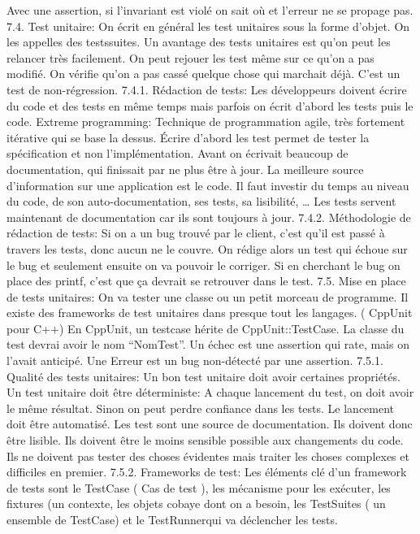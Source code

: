 Avec une assertion, si l’invariant est violé on sait où et l’erreur ne se propage pas.
7.4. Test unitaire:
On écrit en général les test unitaires sous la forme d’objet. On les appelles des testssuites.
Un avantage des tests unitaires est qu’on peut les relancer très facilement. On peut rejouer les test même sur ce qu’on a pas modifié. On vérifie qu’on a pas cassé quelque chose qui marchait déjà. C’est un test de non-régression.
7.4.1. Rédaction de tests:
Les développeurs doivent écrire du code et des tests en même temps mais parfois on écrit d’abord les tests puis le code.
Extreme programming: Technique de programmation agile, très fortement itérative qui se base la dessus.
Écrire d’abord les test permet de tester la spécification et non l’implémentation.
Avant on écrivait beaucoup de documentation, qui finissait par ne plus être à jour. La meilleure source d’information sur une application est le code. Il faut investir du temps au niveau du code, de son auto-documentation, ses tests, sa lisibilité, …
Les tests servent maintenant de documentation car ils sont toujours à jour.
7.4.2. Méthodologie de rédaction de tests:
Si on a un bug trouvé par le client, c’est qu’il est passé à travers les tests, donc aucun ne le couvre.
On rédige alors un test qui échoue sur le bug et seulement ensuite on va pouvoir le corriger.
Si en cherchant le bug on place des printf, c’est que ça devrait se retrouver dans le test.
7.5. Mise en place de tests unitaires:
On va tester une classe ou un petit morceau de programme.
Il existe des frameworks de test unitaires dans presque tout les langages. ( CppUnit pour C++)
En CppUnit, un testcase hérite de CppUnit::TestCase. La classe du test devrai avoir le nom “NomTest”.
Un échec est une assertion qui rate, mais on l’avait anticipé. Une Erreur est un bug non-détecté par une assertion.
7.5.1. Qualité des tests unitaires:
Un bon test unitaire doit avoir certaines propriétés.
Un test unitaire doit être déterministe: A chaque lancement du test, on doit avoir le même résultat. Sinon on peut perdre confiance dans les tests.
Le lancement doit être automatisé.
Les test sont une source de documentation. Ils doivent donc être lisible.
Ils doivent être le moins sensible possible aux changements du code.
Ils ne doivent pas tester des choses évidentes mais traiter les choses complexes et difficiles en premier.
7.5.2. Frameworks de test:
Les éléments clé d’un framework de tests sont le TestCase ( Cas de test ), les mécanisme pour les exécuter, les fixtures (un contexte, les objets cobaye dont on a besoin, les TestSuites ( un ensemble de TestCase) et le TestRunnerqui va déclencher les tests.

